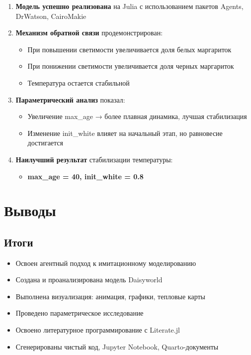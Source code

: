 \documentclass[
  10pt,
  presentation]{beamer}
\providecommand{\tightlist}{%
  \setlength{\itemsep}{0pt}\setlength{\parskip}{0pt}}\usepackage{longtable,booktabs,array}
\begin{document}
\begin{enumerate}
\def\labelenumi{\arabic{enumi}.}
\item
  \textbf{Модель успешно реализована} на Julia с использованием пакетов
  Agents, DrWatson, CairoMakie
\item
  \textbf{Механизм обратной связи} продемонстрирован:

  \begin{itemize}
  \tightlist
  \item
    При повышении светимости увеличивается доля белых маргариток
  \item
    При понижении светимости увеличивается доля черных маргариток
  \item
    Температура остается стабильной
  \end{itemize}
\item
  \textbf{Параметрический анализ} показал:

  \begin{itemize}
  \tightlist
  \item
    Увеличение max\_age → более плавная динамика, лучшая стабилизация
  \item
    Изменение init\_white влияет на начальный этап, но равновесие
    достигается
  \end{itemize}
\item
  \textbf{Наилучший результат} стабилизации температуры:

  \begin{itemize}
  \tightlist
  \item
    \textbf{max\_age = 40, init\_white = 0.8}
  \end{itemize}
\end{enumerate}

\section{Выводы}\label{ux432ux44bux432ux43eux434ux44b-1}

\subsection{Итоги}\label{ux438ux442ux43eux433ux438}

\begin{itemize}
\tightlist
\item
  Освоен агентный подход к имитационному моделированию
\item
  Создана и проанализирована модель Daisyworld
\item
  Выполнена визуализация: анимация, графики, тепловые карты
\item
  Проведено параметрическое исследование
\item
  Освоено литературное программирование с Literate.jl
\item
  Сгенерированы чистый код, Jupyter Notebook, Quarto-документы
\end{itemize}
\end{document}

